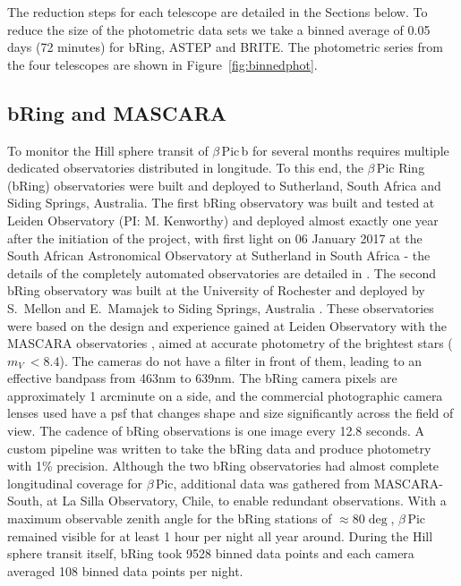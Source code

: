 \documentclass[longauth]{aa} %
\newcommand{\bpb}{$\beta$\,Pic\,b}
\newcommand{\bp}{$\beta$\,Pic}
\begin{document}
The reduction steps for each telescope are detailed in the Sections below.
%
To reduce the size of the photometric data sets we take a binned average of 0.05 days (72 minutes) for bRing, ASTEP and BRITE.
%
The photometric series from the four telescopes are shown in Figure~\ref{fig:binnedphot}.

\subsection{bRing and MASCARA}

To monitor the Hill sphere transit of \bpb{} for several months requires multiple dedicated observatories distributed in longitude.
%
To this end, the \bp{} Ring (bRing) observatories \citep{Stuik17} were built and deployed to Sutherland, South Africa and Siding Springs, Australia.
%
The first bRing observatory was built and tested at Leiden Observatory (PI: M. Kenworthy) and deployed almost exactly one year after the initiation of the project, with first light on 06 January 2017 at the South African Astronomical Observatory at Sutherland in South Africa - the details of the completely automated observatories are detailed in \citet{Stuik17}.
%
The second bRing observatory was built at the University of Rochester and deployed by S.~Mellon and E.~Mamajek to Siding Springs, Australia \citep{Mellon20Thesis}.
%
These observatories were based on the design and experience gained at Leiden Observatory with the MASCARA observatories \citep{talens2017}, aimed at accurate photometry of the brightest stars ($m_V\ < 8.4$).
%
The cameras do not have a filter in front of them, leading to an effective bandpass from 463nm to 639nm.
%
The bRing camera pixels are approximately 1 arcminute on a side, and the commercial photographic camera lenses used have a \ac{psf} that changes shape and size significantly across the field of view.
%
The cadence of bRing observations is one image every 12.8 seconds.
%
A custom pipeline \citep{talens2018} was written to take the bRing data and produce photometry with 1\% precision.
%
Although the two bRing observatories had almost complete longitudinal coverage for \bp{}, additional data was gathered from MASCARA-South, at La Silla Observatory, Chile, to enable redundant observations.
%
With a maximum observable zenith angle for the bRing stations of $\approx 80\deg$, \bp{} remained visible for at least 1 hour per night all year around.
%
During the Hill sphere transit itself, bRing took 9528 binned data points and each camera averaged 108 binned data points per night.
\end{document}
